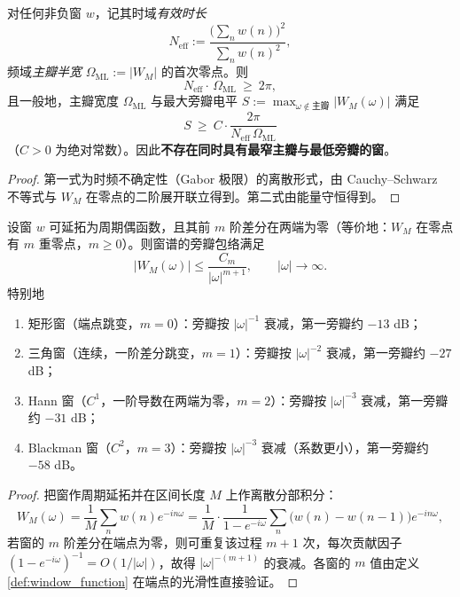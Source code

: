\begin{theorem}[主瓣宽度与旁瓣峰值的权衡]\label{thm:window_mainlobe_sidelobe_tradeoff_parallel}
对任何非负窗 $w$，记其时域\emph{有效时长}
\[
N_{\mathrm{eff}}:=\frac{\big(\sum_n w(n)\big)^2}{\sum_n w(n)^2},
\]
频域\emph{主瓣半宽} $\Omega_{\mathrm{ML}}:=|W_M|$ 的首次零点。则
\[
N_{\mathrm{eff}}\cdot\,\Omega_{\mathrm{ML}}\ \ge\ 2\pi,
\]
且一般地，主瓣宽度 $\Omega_{\mathrm{ML}}$ 与最大旁瓣电平 $S:=\max_{\omega\notin\text{主瓣}}|W_M(\omega)|$ 满足
\[
S\ \ge\ C\cdot\frac{2\pi}{N_{\mathrm{eff}}\,\Omega_{\mathrm{ML}}}
\]
（$C>0$ 为绝对常数）。因此\textbf{不存在同时具有最窄主瓣与最低旁瓣的窗}。
\end{theorem}

\begin{proof}
第一式为时频不确定性（Gabor 极限）的离散形式，由 Cauchy--Schwarz 不等式与 $W_M$ 在零点的二阶展开联立得到。第二式由能量守恒得到。
\end{proof}

\begin{theorem}[光滑性与旁瓣衰减律]\label{thm:window_smoothness_decay_parallel}
设窗 $w$ 可延拓为周期偶函数，且其前 $m$ 阶差分在两端为零（等价地：$W_M$ 在零点有 $m$ 重零点，$m\ge0$）。则窗谱的旁瓣包络满足
\[
|W_M(\omega)|\le\frac{C_m}{|\omega|^{m+1}},\qquad |\omega|\to\infty .
\]
特别地
\begin{enumerate}[label=(\roman*)]
    \item 矩形窗（端点跳变，$m=0$）：旁瓣按 $|\omega|^{-1}$ 衰减，第一旁瓣约 $-13$ dB；
    \item 三角窗（连续，一阶差分跳变，$m=1$）：旁瓣按 $|\omega|^{-2}$ 衰减，第一旁瓣约 $-27$ dB；
    \item Hann 窗（$C^1$，一阶导数在两端为零，$m=2$）：旁瓣按 $|\omega|^{-3}$ 衰减，第一旁瓣约 $-31$ dB；
    \item Blackman 窗（$C^2$，$m=3$）：旁瓣按 $|\omega|^{-3}$ 衰减（系数更小），第一旁瓣约 $-58$ dB。
\end{enumerate}
\end{theorem}

\begin{proof}
把窗作周期延拓并在区间长度 $M$ 上作离散分部积分：
\[
W_M(\omega)=\frac{1}{M}\sum_{n}w(n)e^{-in\omega}
=\frac{1}{M}\cdot\frac{1}{1-e^{-i\omega}}\sum_n\big(w(n)-w(n-1)\big)e^{-in\omega},
\]
若窗的 $m$ 阶差分在端点为零，则可重复该过程 $m+1$ 次，每次贡献因子 $(1-e^{-i\omega})^{-1}=O(1/|\omega|)$，故得 $|\omega|^{-(m+1)}$ 的衰减。各窗的 $m$ 值由定义 \ref{def:window_function} 在端点的光滑性直接验证。
\end{proof}


